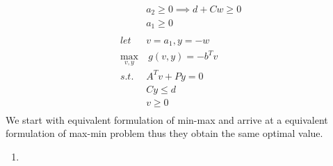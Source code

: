 \documentclass[12pt,letter]{article}
\begin{document}
\begin{enumerate}
\begin{enumerate}
\begin{align*}
                      &a_2 \geq 0 \implies d+Cw \geq 0\\
                      &a_1 \geq 0\\
      \\
      let\ &v = a_1, y = -w\\
      \max_{v,y}&\ g(v,y) = -b^Tv\\
      s.t.\ &A^Tv+Py=0\\
                      &Cy \leq d\\
                      &v \geq 0\\
    \end{align*}
    We start with equivalent formulation of min-max and arrive at a equivalent formulation of max-min problem thus they obtain the same optimal value.
  \end{enumerate}
  \begin{enumerate}
  \item 
  \end{enumerate}
  \pagebreak
  

\end{enumerate}
\end{document}
